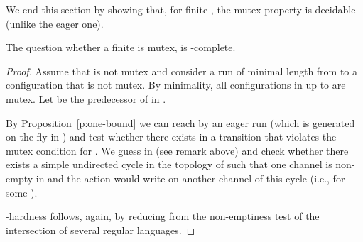 \documentclass{LMCS}
\newenvironment{proposition}{\begin{prop}}{\end{prop}}
\begin{document}
We end this section by showing that, for finite \qcp, the mutex
property is decidable (unlike the eager one).

\begin{proposition} \label{thm:testmutex}
  The question whether a finite \qcp is mutex, is \pspace-complete.
\end{proposition}
\begin{proof}
  Assume that  is not mutex and consider a run 
  of minimal length from  to a configuration
   that is not mutex.
  By minimality, all configurations in  up to 
  are mutex.
  Let  be the predecessor of  in .

  By Proposition~\ref{p:one-bound} we can reach  by an eager
  run  (which is generated on-the-fly in \pspace) and test whether
  there exists in  a transition  that
  violates the mutex condition for .  We guess  in \pspace
  (see remark above) and check
  whether there exists a simple undirected cycle 
  in the topology of  such that one channel  is non-empty in 
  and the action  would write on another channel of this cycle
  (i.e.,  for some ).


  \pspace-hardness follows, again, by reducing from the non-emptiness
  test of the intersection of several regular languages.
\end{proof}
\end{document}
